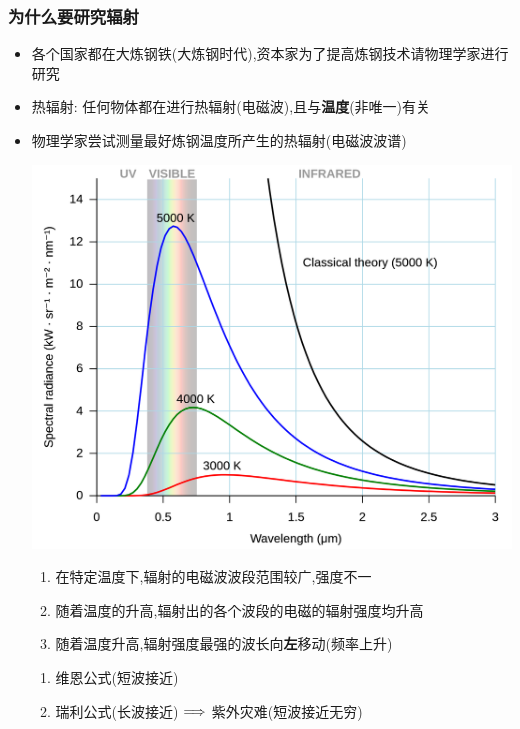 \documentclass{article}
\begin{document}
\subsubsection{为什么要研究辐射}
\begin{itemize}
    \item 各个国家都在大炼钢铁(大炼钢时代),资本家为了提高炼钢技术请物理学家进行研究
    \item 热辐射: 任何物体都在进行热辐射(电磁波),且与\textbf{温度}(非唯一)有关
    \item 物理学家尝试测量最好炼钢温度所产生的热辐射(电磁波波谱)

          \vspace{2em}

          \begin{minipage}{0.48\textwidth}
              \includegraphics[width=\textwidth,keepaspectratio]{./pictures/5.png}
          \end{minipage}
          \hfill
          \begin{minipage}{0.45\textwidth}
              \vspace{-1em}
              \begin{enumerate}[label = (\arabic*)]
                  \item 在特定温度下,辐射的电磁波波段范围较广,强度不一
                  \item 随着温度的升高,辐射出的各个波段的电磁的辐射强度均升高
                  \item 随着温度升高,辐射强度最强的波长向\textbf{左}移动(频率上升)
              \end{enumerate}
              \vspace{1em}
              \begin{enumerate}[label = (\alph*)]
                  \item 维恩公式(短波接近)
                  \item 瑞利公式(长波接近) $\Longrightarrow$ 紫外灾难(短波接近无穷)
              \end{enumerate}
          \end{minipage}
\end{itemize}
\end{document}
